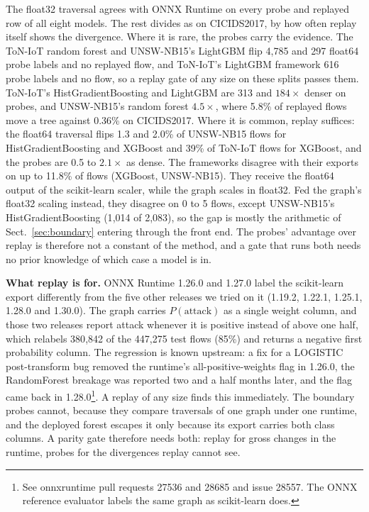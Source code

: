 \documentclass[runningheads]{llncs}
\begin{document}
The float32 traversal agrees with ONNX Runtime on every probe and replayed row of all eight models. The rest divides as on CICIDS2017, by how often replay itself shows the divergence. Where it is rare, the probes carry the evidence. The ToN-IoT random forest and UNSW-NB15's LightGBM flip 4{,}785 and 297 float64 probe labels and no replayed flow, and ToN-IoT's LightGBM framework 616 probe labels and no flow, so a replay gate of any size on these splits passes them. ToN-IoT's HistGradientBoosting and LightGBM are 313 and $184\times$ denser on probes, and UNSW-NB15's random forest $4.5\times$, where 5.8\% of replayed flows move a tree against 0.36\% on CICIDS2017. Where it is common, replay suffices: the float64 traversal flips 1.3 and 2.0\% of UNSW-NB15 flows for HistGradientBoosting and XGBoost and 39\% of ToN-IoT flows for XGBoost, and the probes are 0.5 to $2.1\times$ as dense. The frameworks disagree with their exports on up to 11.8\% of flows (XGBoost, UNSW-NB15). They receive the float64 output of the scikit-learn scaler, while the graph scales in float32. Fed the graph's float32 scaling instead, they disagree on 0 to 5 flows, except UNSW-NB15's HistGradientBoosting (1{,}014 of 2{,}083), so the gap is mostly the arithmetic of Sect.~\ref{sec:boundary} entering through the front end. The probes' advantage over replay is therefore not a constant of the method, and a gate that runs both needs no prior knowledge of which case a model is in.

\textbf{What replay is for.} ONNX Runtime 1.26.0 and 1.27.0 label the scikit-learn export differently from the five other releases we tried on it (1.19.2, 1.22.1, 1.25.1, 1.28.0 and 1.30.0). The graph carries $P(\text{attack})$ as a single weight column, and those two releases report attack whenever it is positive instead of above one half, which relabels 380{,}842 of the 447{,}275 test flows (85\%) and returns a negative first probability column. The regression is known upstream: a fix for a LOGISTIC post-transform bug removed the runtime's all-positive-weights flag in 1.26.0, the RandomForest breakage was reported two and a half months later, and the flag came back in 1.28.0\footnote{See onnxruntime pull requests 27536 and 28685 and issue 28557. The ONNX reference evaluator labels the same graph as scikit-learn does.}. A replay of any size finds this immediately. The boundary probes cannot, because they compare traversals of one graph under one runtime, and the deployed forest escapes it only because its export carries both class columns. A parity gate therefore needs both: replay for gross changes in the runtime, probes for the divergences replay cannot see.
\end{document}
